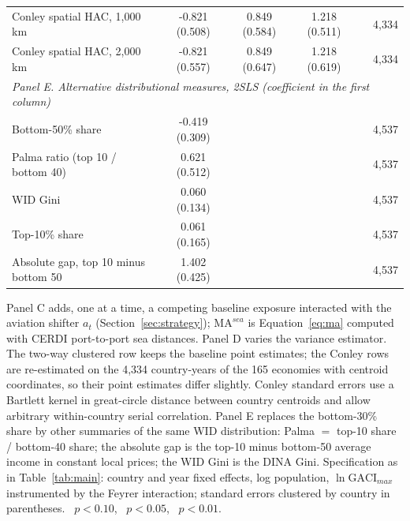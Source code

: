 \begin{table}[p]
\begin{minipage}{\linewidth}
{\begin{tabular}{lcccrr}
Conley spatial HAC, 1{,}000 km & -0.821 (0.508) & 0.849 (0.584) & 1.218\sym{**} (0.511) &  & 4{,}334 \\
Conley spatial HAC, 2{,}000 km & -0.821 (0.557) & 0.849 (0.647) & 1.218\sym{**} (0.619) &  & 4{,}334 \\
\multicolumn{6}{l}{\emph{Panel E. Alternative distributional measures, 2SLS (coefficient in the first column)}}\\
Bottom-50\% share & -0.419 (0.309) & & & & 4{,}537 \\
Palma ratio (top 10 / bottom 40) & 0.621 (0.512) & & & & 4{,}537 \\
WID Gini & 0.060 (0.134) & & & & 4{,}537 \\
Top-10\% share & 0.061 (0.165) & & & & 4{,}537 \\
Absolute gap, top 10 minus bottom 50 & 1.402\sym{***} (0.425) & & & & 4{,}537 \\
\bottomrule
\end{tabular}}
\par\vspace{3pt}\begin{flushleft}\footnotesize Panel C adds, one at a time, a competing baseline exposure interacted with the aviation shifter $a_t$ (Section~\ref{sec:strategy}); $\mathrm{MA}^{sea}$ is Equation~\eqref{eq:ma} computed with CERDI port-to-port sea distances. Panel D varies the variance estimator. The two-way clustered row keeps the baseline point estimates; the Conley rows are re-estimated on the 4{,}334 country-years of the 165 economies with centroid coordinates, so their point estimates differ slightly. Conley standard errors use a Bartlett kernel in great-circle distance between country centroids and allow arbitrary within-country serial correlation. Panel E replaces the bottom-30\% share by other summaries of the same WID distribution: Palma $=$ top-10 share / bottom-40 share; the absolute gap is the top-10 minus bottom-50 average income in constant local prices; the WID Gini is the DINA Gini. Specification as in Table~\ref{tab:main}: country and year fixed effects, log population, $\ln\mathrm{GACI}_{max}$ instrumented by the Feyrer interaction; standard errors clustered by country in parentheses. \sym{*}~$p<0.10$, \sym{**}~$p<0.05$, \sym{***}~$p<0.01$.\end{flushleft}
\end{minipage}
\end{table}


